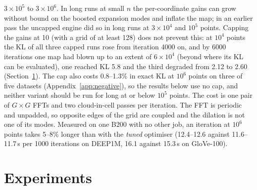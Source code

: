 \documentclass[11pt]{article}
\begin{document}
$3\times10^5$ to $3\times10^6$. In long runs at small $n$ the per-coordinate gains can grow without bound on the
boosted expansion modes and inflate the map; in an earlier pass the uncapped engine did so in long runs at
$3\times10^4$ and $10^5$ points. Capping the gains at 10 (with a grid of at least 128) does not prevent this: at
$10^4$ points the KL of all three capped runs rose from iteration 4000 on, and by 6000 iterations one map had blown up
to an extent of $6\times10^4$ (beyond where its KL can be evaluated), one reached KL 5.8 and the third degraded from
2.12 to 2.60 (Section~\ref{sec:exp}). The cap also costs 0.8--1.3\% in exact KL at $10^6$ points on three of five
datasets (Appendix~\ref{app:negative}), so the results below use no cap, and neither variant should be run for long
at or below $10^5$ points. The cost is one pair of $G\times G$ FFTs and two
cloud-in-cell passes per iteration. The FFT is periodic and unpadded, so opposite edges of the grid are coupled and
the dilation is not one of its modes. Measured on one B200 with no other job, an iteration at $10^6$ points takes
5--8\% longer than with the \emph{tuned} optimiser (12.4--12.6 against 11.6--11.7\,s per 1000 iterations on DEEP1M,
16.1 against 15.3\,s on GloVe-100).

\section{Experiments}\label{sec:exp}
\end{document}
